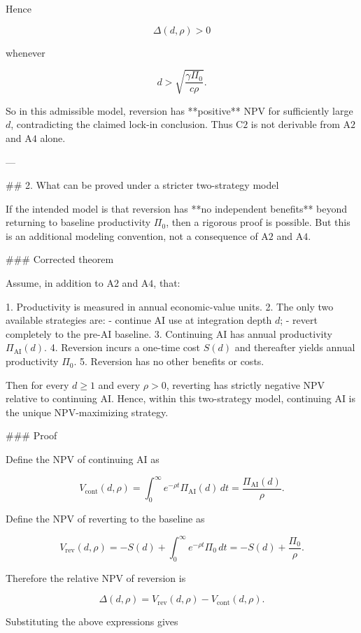 Hence

\[
\Delta(d,\rho)>0
\]

whenever

\[
d>\sqrt{\frac{\gamma \Pi_0}{c\rho}}.
\]

So in this admissible model, reversion has **positive** NPV for sufficiently large \(d\), contradicting the claimed lock-in conclusion. Thus \(\mathrm{C2}\) is not derivable from \(\mathrm{A2}\) and \(\mathrm{A4}\) alone.

---

## 2. What can be proved under a stricter two-strategy model

If the intended model is that reversion has **no independent benefits** beyond returning to baseline productivity \(\Pi_0\), then a rigorous proof is possible. But this is an additional modeling convention, not a consequence of \(\mathrm{A2}\) and \(\mathrm{A4}\).

### Corrected theorem

Assume, in addition to \(\mathrm{A2}\) and \(\mathrm{A4}\), that:

1. Productivity is measured in annual economic-value units.
2. The only two available strategies are:
   - continue AI use at integration depth \(d\);
   - revert completely to the pre-AI baseline.
3. Continuing AI has annual productivity \(\Pi_{\mathrm{AI}}(d)\).
4. Reversion incurs a one-time cost \(S(d)\) and thereafter yields annual productivity \(\Pi_0\).
5. Reversion has no other benefits or costs.

Then for every \(d\ge 1\) and every \(\rho>0\), reverting has strictly negative NPV relative to continuing AI. Hence, within this two-strategy model, continuing AI is the unique NPV-maximizing strategy.

### Proof

Define the NPV of continuing AI as

\[
V_{\mathrm{cont}}(d,\rho)
=
\int_0^\infty e^{-\rho t}\Pi_{\mathrm{AI}}(d)\,dt
=
\frac{\Pi_{\mathrm{AI}}(d)}{\rho}.
\]

Define the NPV of reverting to the baseline as

\[
V_{\mathrm{rev}}(d,\rho)
=
-S(d)
+
\int_0^\infty e^{-\rho t}\Pi_0\,dt
=
-S(d)+\frac{\Pi_0}{\rho}.
\]

Therefore the relative NPV of reversion is

\[
\Delta(d,\rho)
=
V_{\mathrm{rev}}(d,\rho)
-
V_{\mathrm{cont}}(d,\rho).
\]

Substituting the above expressions gives

